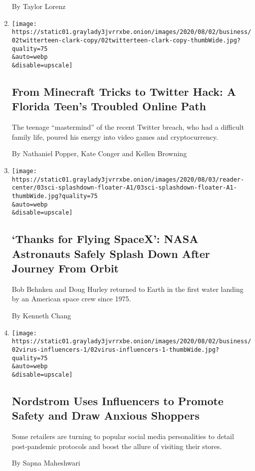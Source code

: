 \begin{enumerate}
  By Taylor Lorenz
\item
  \href{/2020/08/02/technology/florida-teenager-twitter-hack.html}{}

  \texttt{[image: https://static01.graylady3jvrrxbe.onion/images/2020/08/02/business/02twitterteen-clark-copy/02twitterteen-clark-copy-thumbWide.jpg?quality=75\\\&auto=webp\\\&disable=upscale]}

  \hypertarget{from-minecraft-tricks-to-twitter-hack-a-florida-teens-troubled-online-path}{%
  \subsection{From Minecraft Tricks to Twitter Hack: A Florida Teen's
  Troubled Online
  Path}\label{from-minecraft-tricks-to-twitter-hack-a-florida-teens-troubled-online-path}}

  The teenage ``mastermind'' of the recent Twitter breach, who had a
  difficult family life, poured his energy into video games and
  cryptocurrency.

  By Nathaniel Popper, Kate Conger and Kellen Browning
\item
  \href{/2020/08/02/science/spacex-astronauts-splashdown.html}{}

  \texttt{[image: https://static01.graylady3jvrrxbe.onion/images/2020/08/03/reader-center/03sci-splashdown-floater-A1/03sci-splashdown-floater-A1-thumbWide.jpg?quality=75\\\&auto=webp\\\&disable=upscale]}

  \hypertarget{thanks-for-flying-spacex-nasa-astronauts-safely-splash-down-after-journey-from-orbit}{%
  \subsection{`Thanks for Flying SpaceX': NASA Astronauts Safely Splash
  Down After Journey From
  Orbit}\label{thanks-for-flying-spacex-nasa-astronauts-safely-splash-down-after-journey-from-orbit}}

  Bob Behnken and Doug Hurley returned to Earth in the first water
  landing by an American space crew since 1975.

  By Kenneth Chang
\item
  \href{/2020/08/02/business/media/coronavirus-nordstrom-infuencers.html}{}

  \texttt{[image: https://static01.graylady3jvrrxbe.onion/images/2020/08/02/business/02virus-influencers-1/02virus-influencers-1-thumbWide.jpg?quality=75\\\&auto=webp\\\&disable=upscale]}

  \hypertarget{nordstrom-uses-influencers-to-promote-safety-and-draw-anxious-shoppers}{%
  \subsection{Nordstrom Uses Influencers to Promote Safety and Draw
  Anxious
  Shoppers}\label{nordstrom-uses-influencers-to-promote-safety-and-draw-anxious-shoppers}}

  Some retailers are turning to popular social media personalities to
  detail post-pandemic protocols and boost the allure of visiting their
  stores.

  By Sapna Maheshwari
\end{enumerate}

